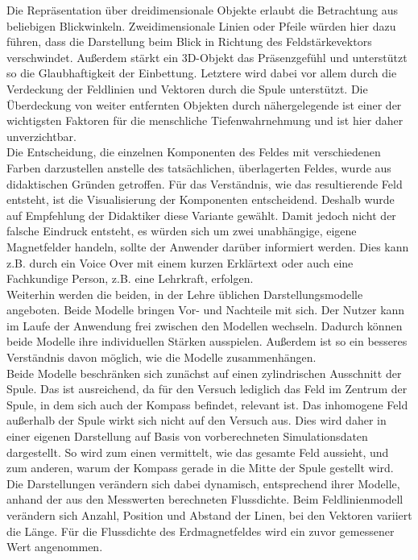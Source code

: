 Die Repräsentation über dreidimensionale Objekte erlaubt die Betrachtung aus beliebigen Blickwinkeln. Zweidimensionale Linien oder Pfeile würden hier dazu führen, dass die Darstellung beim Blick in Richtung des Feldstärkevektors verschwindet. Außerdem stärkt ein 3D-Objekt das Präsenzgefühl und unterstützt so die Glaubhaftigkeit der Einbettung. Letztere wird dabei vor allem durch die Verdeckung der Feldlinien und Vektoren durch die Spule unterstützt. Die Überdeckung von weiter entfernten Objekten durch nähergelegende ist einer der wichtigsten Faktoren für die menschliche Tiefenwahrnehmung und ist hier daher unverzichtbar.\\

Die Entscheidung, die einzelnen Komponenten des Feldes mit verschiedenen Farben darzustellen anstelle des tatsächlichen, überlagerten Feldes, wurde aus didaktischen Gründen getroffen. Für das Verständnis, wie das resultierende Feld entsteht, ist die Visualisierung der Komponenten entscheidend. Deshalb wurde auf Empfehlung der Didaktiker diese Variante gewählt. Damit jedoch nicht der falsche Eindruck entsteht, es würden sich um zwei unabhängige, eigene Magnetfelder handeln, sollte der Anwender darüber informiert werden. Dies kann z.B. durch ein Voice Over mit einem kurzen Erklärtext oder auch eine Fachkundige Person, z.B. eine Lehrkraft, erfolgen.\\

Weiterhin werden die beiden, in der Lehre üblichen Darstellungsmodelle angeboten. Beide Modelle bringen Vor- und Nachteile mit sich. Der Nutzer kann im Laufe der Anwendung frei zwischen den Modellen wechseln. Dadurch können beide Modelle ihre individuellen Stärken ausspielen. Außerdem ist so ein besseres Verständnis davon möglich, wie die Modelle zusammenhängen.\\

Beide Modelle beschränken sich zunächst auf einen zylindrischen Ausschnitt der Spule. Das ist ausreichend, da für den Versuch lediglich das Feld im Zentrum der Spule, in dem sich auch der Kompass befindet, relevant ist. Das inhomogene Feld außerhalb der Spule wirkt sich nicht auf den Versuch aus. Dies wird daher in einer eigenen Darstellung auf Basis von vorberechneten Simulationsdaten dargestellt. So wird zum einen vermittelt, wie das gesamte Feld aussieht, und zum anderen, warum der Kompass gerade in die Mitte der Spule gestellt wird.\\

Die Darstellungen verändern sich dabei dynamisch, entsprechend ihrer Modelle, anhand der aus den Messwerten berechneten Flussdichte. Beim Feldlinienmodell verändern sich Anzahl, Position und Abstand der Linen, bei den Vektoren variiert die Länge. Für die Flussdichte des Erdmagnetfeldes wird ein zuvor gemessener Wert angenommen.\\

